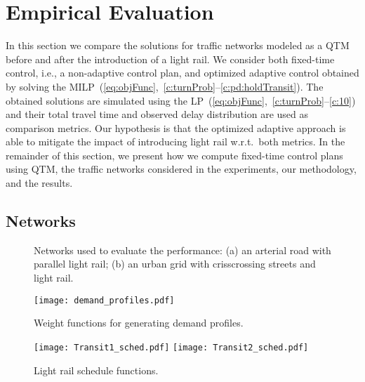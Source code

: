 \section{Empirical Evaluation}
  
In this section we compare the solutions for traffic networks modeled as a QTM
before and after the introduction of a light rail.
%
We consider both fixed-time control, i.e., a non-adaptive control plan, and optimized
adaptive control obtained by solving the
MILP~(\ref{eq:objFunc},~\ref{c:turnProb}--\ref{c:pd:holdTransit}).
%
The obtained solutions are simulated using the
LP~(\ref{eq:objFunc},~\ref{c:turnProb}--\ref{c:10}) and their total
travel time and observed delay distribution are used as comparison metrics.
%
Our hypothesis is that the optimized adaptive approach is able to mitigate the
impact of introducing light rail w.r.t.\ both metrics.
%
In the remainder of this section, we present how we compute fixed-time control plans
using QTM, the traffic networks considered in the experiments, our methodology,
and the results.






\subsection{Networks}

\begin{figure}[t!]
\centering
\caption{Networks used to evaluate the performance:
  (a) an arterial road with parallel light rail;
  (b) an urban grid with crisscrossing streets and light rail.
%
}
\label{fig:networks}
\end{figure}

\begin{figure}[t!]
\centering
\texttt{[image: demand\_profiles.pdf]}
\caption{Weight functions for generating demand profiles.}
\label{fig:demand_profiles}
\end{figure}

\begin{figure}[t!]
\centering
\texttt{[image: Transit1\_sched.pdf]}
\texttt{[image: Transit2\_sched.pdf]}
\caption{Light rail schedule functions.}
\label{fig:transits}
\end{figure}

